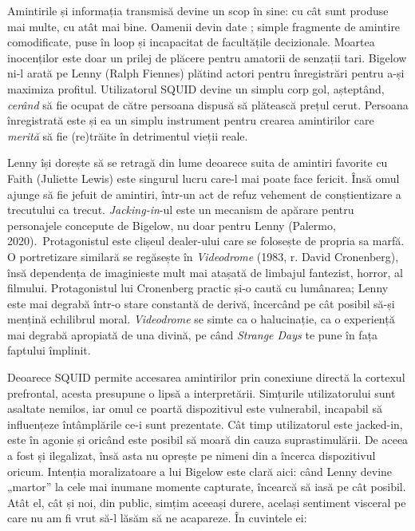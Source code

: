 \documentclass[12pt]{article}
\begin{document}
	Amintirile și informația transmisă devine un scop în sine: cu cât sunt produse mai multe, cu atât mai bine. Oamenii devin date \cite{Vishnevetsky2012a}; simple fragmente de amintire comodificate, puse în loop și incapacitat de facultățile decizionale. Moartea inocenților este doar un prilej de plăcere pentru amatorii de senzații tari. Bigelow ni-l arată pe Lenny (Ralph Fiennes) plătind actori pentru înregistrări pentru a-și maximiza profitul. Utilizatorul SQUID devine un simplu corp gol, așteptând, \textit{cerând} să fie ocupat de către persoana dispusă să plătească prețul cerut. Persoana înregistrată este și ea un simplu instrument pentru crearea amintirilor care \textit{merită} să fie (re)trăite în detrimentul vieții reale.\par
	
	Lenny își dorește să se retragă din lume deoarece suita de amintiri favorite cu Faith (Juliette Lewis) este singurul lucru care-l mai poate face fericit. Însă omul ajunge să fie jefuit de amintiri, într-un act de refuz vehement de conștientizare a trecutului ca trecut. \textit{Jacking-in}-ul este un mecanism de apărare pentru personajele concepute de Bigelow, nu doar pentru Lenny (Palermo, 2020). Protagonistul este clișeul dealer-ului care se folosește de propria sa marfă. O portretizare similară se regăsește în \textit{Videodrome} (1983, r. David Cronenberg), însă \dedouble dependența de imagini\sqtworight este mult mai atașată de limbajul fantezist, horror, al filmului. Protagonistul lui Cronenberg practic și-o caută cu lumânarea; Lenny este mai degrabă într-o stare constantă de derivă, încercând pe cât posibil să-și mențină echilibrul moral. \textit{Videodrome} se simte ca o halucinație, ca o experiență mai degrabă apropiată de una divină, pe când \textit{Strange Days} te pune în fața faptului împlinit.\par
	
	Deoarece SQUID permite accesarea amintirilor prin conexiune directă la cortexul prefrontal, acesta presupune o lipsă a interpretării. Simțurile utilizatorului sunt asaltate nemilos, iar omul ce poartă dispozitivul este vulnerabil, incapabil să influențeze întâmplările ce-i sunt prezentate. Cât timp utilizatorul este jacked-in, este în agonie și oricând este posibil să moară din cauza suprastimulării. De aceea a fost și ilegalizat, însă asta nu oprește pe nimeni din a încerca dispozitivul oricum. Intenția moralizatoare a lui Bigelow este clară aici: când Lenny devine „martor” la cele mai inumane momente capturate, încearcă să iasă pe cât posibil. Atât el, cât și noi, din public, simțim aceeași durere, același sentiment visceral pe care nu am fi vrut să-l lăsăm să ne acapareze. În cuvintele ei:\par
	
\end{document}
